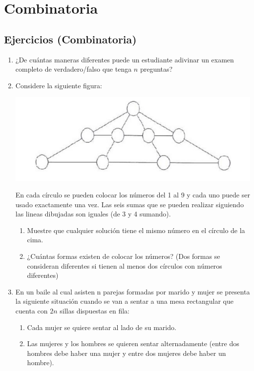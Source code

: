 \documentclass{book}
\begin{document}
    \chapter{Combinatoria}


    \section{Ejercicios (Combinatoria)}
    \begin{enumerate}
        \item ¿De cuántas maneras diferentes puede un estudiante adivinar un examen completo de verdadero/falso que tenga $n$ preguntas?
        \item Considere la siguiente figura:
        \begin{center}
            \includegraphics[scale=1]{imagenes/Combinatoria/1,1.png}
        \end{center}
        En cada círculo se pueden colocar los números del 1 al 9 y cada uno puede ser usado exactamente una vez. Las seis sumas que se pueden realizar siguiendo las lineas dibujadas son iguales (de 3 y 4 sumando).
        \begin{enumerate}
            \item Muestre que cualquier solución tiene el mismo número en el círculo de la cima.
            \item ¿Cuántas formas existen de colocar los números? (Dos formas se consideran diferentes si tienen al menos dos círculos con números diferentes)
        \end{enumerate}
        \item En un baile al cual asisten n parejas formadas por marido y mujer se presenta la siguiente situación cuando se van a sentar a una mesa rectangular que cuenta con $2n$ sillas dispuestas en fila:
        \begin{enumerate}
            \item Cada mujer se quiere sentar al lado de su marido.
            \item Las mujeres y los hombres se quieren sentar alternadamente (entre dos hombres debe haber una mujer y entre dos mujeres debe haber un hombre).

\end{enumerate}
\end{enumerate}
\end{document}
